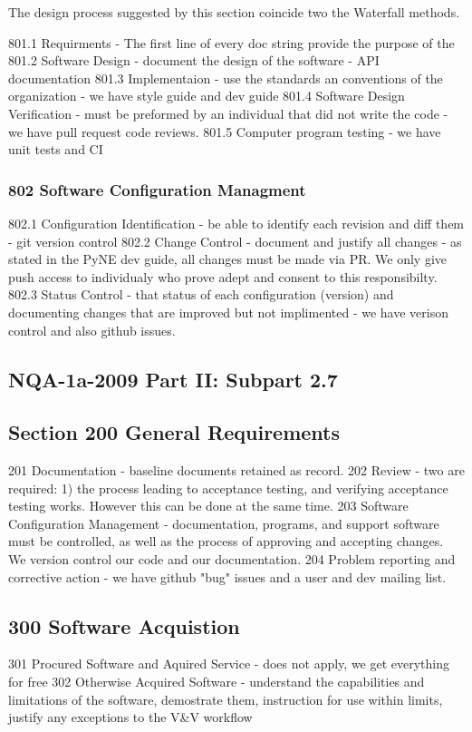 \documentclass{anstrans}
\begin{document}
The design process suggested by this section coincide two the Waterfall methods.


801.1 Requirments - The first line of every doc string provide the purpose of the 
801.2 Software Design - document the design of the software - API documentation
801.3 Implementaion - use the standards an conventions of the organization - we have style guide and dev guide
801.4 Software Design Verification - must be preformed by an individual that did not write the code  - we have pull request code reviews.
801.5 Computer program testing - we have unit tests and CI

\subsubsection{802 Software Configuration Managment}

802.1 Configuration Identification - be able to identify each revision and diff them - git version control
802.2 Change Control - document and justify all changes - as stated in the PyNE dev guide, all changes must be made via PR. We only give push access to individualy who prove adept and consent to this responsibilty.
802.3 Status Control - that status of each configuration (version) and documenting changes that are improved but not implimented - we have verison control and also github issues.


\subsection{NQA-1a-2009 Part II: Subpart 2.7}

\subsection{Section 200 General Requirements}

201 Documentation - baseline documents retained as record.
202 Review  - two are required: 1) the process leading to acceptance testing, and verifying acceptance testing works. However this can be done at the same time.
203 Software Configuration Management - documentation, programs, and support software must be controlled, as well as the process of approving and accepting changes. We version control our code and our documentation.
204 Problem reporting and corrective action - we have github "bug" issues and a user and dev mailing list.

\subsection{300 Software Acquistion}
301 Procured Software and Aquired Service - does not apply, we get everything for free
302 Otherwise Acquired Software - understand the capabilities and limitations of the software, demostrate them, instruction for use within limits, justify any exceptions to the V\&V workflow
\end{document}

